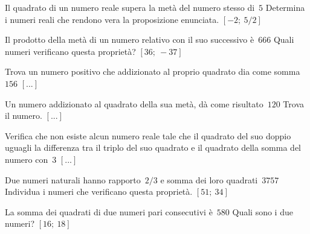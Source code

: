 \begin{multicols}{2}



\begin{esercizio}[\Ast]
 \label{ese:3.112}
Il quadrato di un numero reale supera la metà del numero stesso di~\(5\)
Determina i numeri reali che rendono vera la proposizione enunciata.
\hfill\(\left[-2;~5/2\right]\)
\end{esercizio}

\begin{esercizio}[\Ast]
 \label{ese:3.113}
Il prodotto della metà di un numero relativo con il suo successivo è~\(666\)
Quali numeri verificano questa proprietà?
\hfill\(\left[36;~-37\right]\)
\end{esercizio}

\begin{esercizio}
 \label{ese:3.114}
Trova un numero positivo che addizionato al proprio quadrato dia come 
somma~\(156\)
\hfill\(\left[...\right]\)
\end{esercizio}

\begin{esercizio}
 \label{ese:3.115}
Un numero addizionato al quadrato della sua metà, dà come risultato~\(120\)
Trova il numero.
\hfill\(\left[...\right]\)
\end{esercizio}

\begin{esercizio}
 \label{ese:3.116}
Verifica che non esiste alcun numero reale tale che il quadrato del suo
doppio uguagli la differenza tra il triplo del suo quadrato e il quadrato
della somma del numero con~\(3\)
\hfill\(\left[...\right]\)
\end{esercizio}

\begin{esercizio}[\Ast]
 \label{ese:3.117}
Due numeri naturali hanno rapporto~\(2/3\) e somma dei loro 
quadrati~\(3757\)
Individua i numeri che verificano questa proprietà.
\hfill\(\left[51;~34\right]\)
\end{esercizio}

\begin{esercizio}[\Ast]
 \label{ese:3.118}
La somma dei quadrati di due numeri pari consecutivi è~\(580\) Quali sono i
due numeri?
\hfill\(\left[16;~18\right]\)
\end{esercizio}


\end{multicols}
